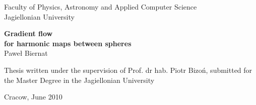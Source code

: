 \thispagestyle{empty}

\begin{center}
\large\sffamily Faculty of Physics, Astronomy and Applied Computer Science\\
Jagiellonian University

\vspace*{1cm} {\Huge\sffamily\bfseries Gradient flow\\
for harmonic maps between spheres
\\}
\vspace{2cm}
{\LARGE\sffamily
Paweł Biernat\\
\vspace{3.cm} }

\begin{minipage}{.15\linewidth}
  
\end{minipage}
\vspace{3.cm}

\begin{minipage}{0.9\textwidth} {\centering\large\sffamily Thesis written under the
    supervision of Prof. dr hab.  Piotr Bizoń, submitted for the
    Master Degree in the Jagiellonian University\\}
\end{minipage}
\end{center}

\begin{center}
\vspace{1.5cm}
{\large\sffamily Cracow, June 2010}
\end{center}

